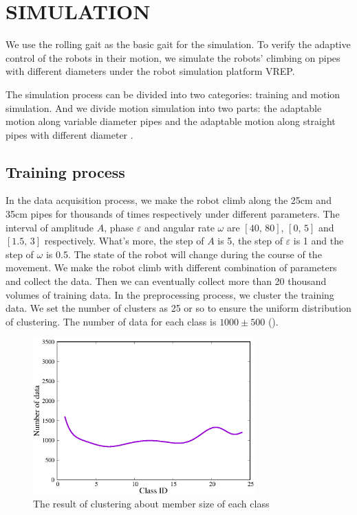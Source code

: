 \section{SIMULATION}
We use the rolling gait as the basic gait for the simulation. To verify the adaptive control of the robots in their motion, we simulate the robots' climbing on pipes with different diameters under the robot simulation platform VREP.

The simulation process can be divided into two categories: training and motion simulation. And we divide motion simulation into two parts: the adaptable motion along variable diameter pipes and the adaptable motion along straight pipes with different diameter .

\subsection{Training process}

In the data acquisition process, we make the robot climb along the 25cm and 35cm pipes for thousands of times respectively under different parameters. The interval of amplitude $A$, phase $\varepsilon$ and angular rate $\omega$ are $[40, \, 80]$, $[0, \, 5]$ and $[1.5, \, 3]$ respectively. What's more, the step of $A$ is 5, the step of $\varepsilon$ is 1 and the step of $\omega$ is 0.5. The state of the robot will change during the course of the movement. We make the robot climb with different combination of parameters and collect the data. Then we can eventually collect more than 20 thousand volumes of training data. In the preprocessing process, we cluster the training data. We set the number of clusters as 25 or so to ensure the uniform distribution of clustering. The number of data for each class is $1000 \pm 500 $ ().

\begin{figure}[t]
	\centering
	\includegraphics[height=6cm,width=\linewidth]{fig/experiment/170912/cluster}
	\caption{The result of clustering about member size of each class}
\end{figure}

